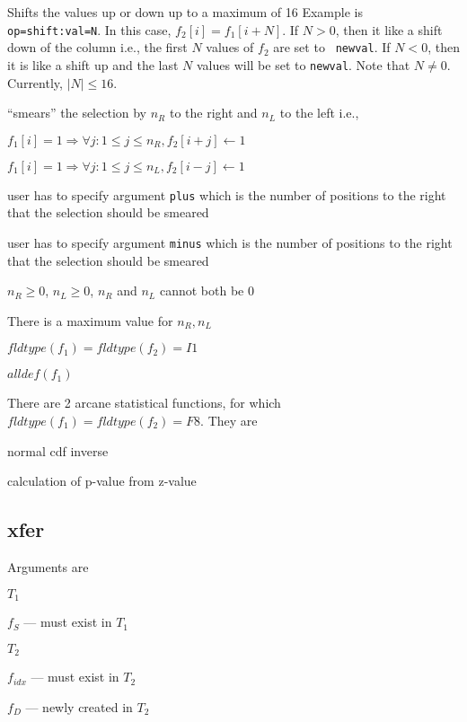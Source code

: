 \item [SHIFT] Shifts the values up or down up to a maximum of 16
Example is \verb+op=shift:val=N+. In this case,
\(f_2[i] = f_1[i+N]\). If \(N > 0 \), then it like a shift down
of the column i.e., the first \(N\) values of \(f_2\) are set to {\tt
  newval}. 
  If
\(N < 0\), then it is like a shift up and the last \(N\) values will be
set to {\tt newval}. 
Note that \(N \neq 0\). Currently, \(|N| \leq 16\).

\item [SMEAR] ``smears'' the selection by \(n_R\) to the right and
\(n_L\) to the left i.e., 
\bi
\item 
\(f_1[i] = 1 \Rightarrow \forall j: 1 \leq j \leq n_R, f_2[i+j] \leftarrow 1\)
  \item 
\(f_1[i] = 1 \Rightarrow \forall j: 1 \leq j \leq n_L, f_2[i-j] \leftarrow 1\) 
\ei
\be
\item user has to specify argument {\tt plus} which is the number of
positions to the right that the selection should be smeared
\item user has to specify argument {\tt minus} which is the number of
positions to the right that the selection should be smeared
\item \(n_R \geq 0\), \(n_L \geq 0\), \(n_R\) and \(n_L\) cannot both be
0
\item There is a maximum value for \(n_R, n_L\)
\item \(fldtype(f_1) = fldtype(f_2) = I1\)
\item \(alldef(f_1)\)
\ee
\ed

There are 2 arcane statistical functions, for which \(fldtype(f_1) =
fldtype(f_2) = F8\). They are
\be
\item normal cdf inverse
\item calculation of p-value from z-value
\ee

\subsection{xfer}
\label{xfer}

Arguments are 
\be
\item \(T_1\)
\item \(f_S\) --- must exist in \(T_1\)
\item \(T_2\)
\item \(f_{idx}\) --- must exist in \(T_2\)
\item \(f_D\) --- newly created in \(T_2\)
\ee

